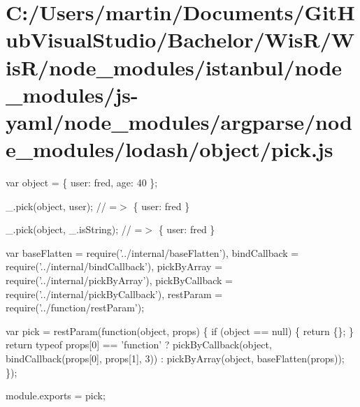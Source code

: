 \hypertarget{_c_1_2_users_2martin_2_documents_2_git_hub_visual_studio_2_bachelor_2_wis_r_2_wis_r_2node_module8e8ca8a6e60246b7adc5a3c280b6a21b}{}\section{C\+:/\+Users/martin/\+Documents/\+Git\+Hub\+Visual\+Studio/\+Bachelor/\+Wis\+R/\+Wis\+R/node\+\_\+modules/istanbul/node\+\_\+modules/js-\/yaml/node\+\_\+modules/argparse/node\+\_\+modules/lodash/object/pick.\+js}
var object = \{ \textquotesingle{}user\textquotesingle{}\+: \textquotesingle{}fred\textquotesingle{}, \textquotesingle{}age\textquotesingle{}\+: 40 \};

\+\_\+.\+pick(object, \textquotesingle{}user\textquotesingle{}); // =$>$ \{ \textquotesingle{}user\textquotesingle{}\+: \textquotesingle{}fred\textquotesingle{} \}

\+\_\+.\+pick(object, \+\_\+.\+is\+String); // =$>$ \{ \textquotesingle{}user\textquotesingle{}\+: \textquotesingle{}fred\textquotesingle{} \}


\begin{DoxyCodeInclude}
var baseFlatten = require(\textcolor{stringliteral}{'../internal/baseFlatten'}),
    bindCallback = require(\textcolor{stringliteral}{'../internal/bindCallback'}),
    pickByArray = require(\textcolor{stringliteral}{'../internal/pickByArray'}),
    pickByCallback = require(\textcolor{stringliteral}{'../internal/pickByCallback'}),
    restParam = require(\textcolor{stringliteral}{'../function/restParam'});

var pick = restParam(\textcolor{keyword}{function}(\textcolor{keywordtype}{object}, props) \{
  \textcolor{keywordflow}{if} (\textcolor{keywordtype}{object} == null) \{
    \textcolor{keywordflow}{return} \{\};
  \}
  \textcolor{keywordflow}{return} typeof props[0] == \textcolor{stringliteral}{'function'}
    ? pickByCallback(\textcolor{keywordtype}{object}, bindCallback(props[0], props[1], 3))
    : pickByArray(object, baseFlatten(props));
\});

module.exports = pick;
\end{DoxyCodeInclude}
 